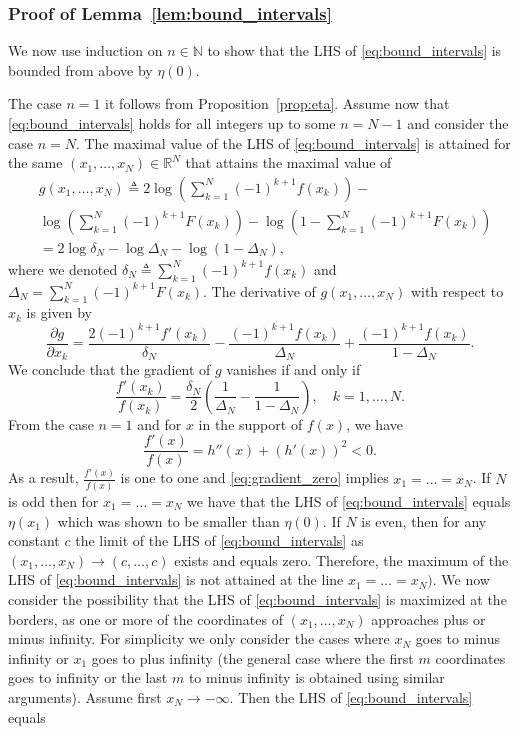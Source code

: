 \documentclass[letterpaper, conference, 11pt]{IEEEtran}      %
\begin{document}
\subsubsection*{Proof of Lemma~\ref{lem:bound_intervals}} 
We now use induction on $n \in \mathbb N$ to show that the LHS of \eqref{eq:bound_intervals} is bounded from above by $\eta(0)$. \par
The case $n=1$ it follows from Proposition~\ref{prop:eta}. 
Assume now that \eqref{eq:bound_intervals} holds for all integers up to some $n = N-1$ and consider the case $n = N$. The maximal value of the LHS of \eqref{eq:bound_intervals} is attained for the same $(x_1,\ldots,x_N) \in \mathbb R^N$ that attains the maximal value of 
\begin{align*}
& g(x_1,\ldots, x_N) \triangleq 2 \log \left(  \sum_{k=1}^{N} (-1)^{k+1} f(x_k) \right) - \\
&  \log
\left( \sum_{k=1}^N (-1)^{k+1} F(x_k) \right)
-\log \left(1 -  \sum_{k=1}^N (-1)^{k+1} F(x_k) \right) \\
& = 2 \log \delta_N - \log \Delta_N - \log \left(1 - \Delta_N  \right),
\end{align*}
where we denoted $\delta_N \triangleq \sum_{k=1}^{N} (-1)^{k+1} f(x_k)$ and $\Delta_N =  \sum_{k=1}^N (-1)^{k+1} F(x_k)$. The derivative of $g(x_1,\ldots,x_N)$ with respect to $x_k$ is given by
\[
\frac{\partial  g}{\partial x_k} = \frac{2 (-1)^{k+1} f'(x_k)}{\delta_N} -\frac{(-1)^{k+1} f(x_k)}{\Delta_N } + \frac{(-1)^{k+1} f(x_k)}{1-\Delta_N }.
\]
We conclude that the gradient of $g$ vanishes if and only if
\begin{equation}
\label{eq:gradient_zero}
\frac{f'(x_k)}{f(x_k)} = \frac{\delta_N}{2} \left( \frac{1}{\Delta_N} - \frac{1}{1-\Delta_N} \right),\quad k=1,\ldots,N.
\end{equation}
From the case $n=1$ and for $x$ in the support of $f(x)$, we have
\[
\frac{f'(x)}{f(x)} = h''(x)+\left(h'(x)\right)^2 < 0 . 
\]
As a result, $\frac{f'(x)}{f(x)}$ is one to one and \eqref{eq:gradient_zero} implies $x_1 = \ldots = x_N$. If $N$ is odd then for $x_1=\ldots =x_N$ we have that the LHS of \eqref{eq:bound_intervals} equals $\eta(x_1)$ which was shown to be smaller than $\eta(0)$. If $N$ is even, then for any constant $c$ the limit of the LHS of \eqref{eq:bound_intervals} as $(x_1,\ldots,x_N)\rightarrow (c,\ldots,c)$ exists and equals zero. Therefore, the maximum of the LHS of \eqref{eq:bound_intervals} is not attained at the line $x_1=\ldots=x_N)$. We now consider the possibility that the LHS of \eqref{eq:bound_intervals} is maximized at the borders, as one or more of the coordinates of $(x_1,\ldots,x_N)$ approaches plus or minus infinity. For simplicity we only consider the cases where $x_N$ goes to minus infinity or $x_1$ goes to plus infinity (the general case where the first $m$ coordinates goes to infinity or the last $m$ to minus infinity is obtained using similar arguments). Assume first $x_N \rightarrow -\infty$. Then the LHS of \eqref{eq:bound_intervals} equals
\end{document}
